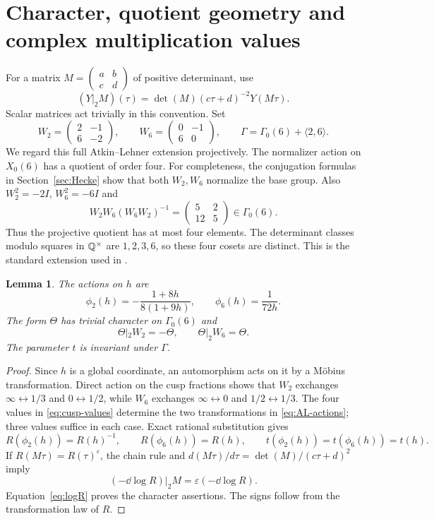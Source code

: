 \documentclass[11pt,a4paper]{article}
\newtheorem{lemma}[theorem]{Lemma}
\theoremstyle{remark}
\newcommand{\smat}[4]{\begin{pmatrix}#1&#2\\#3&#4\end{pmatrix}}
\begin{document}
\section{Character, quotient geometry and complex multiplication values}
\label{sec:geometry}
For a matrix $M=\smat abcd$ of positive determinant, use
\begin{equation}\label{eq:slash}
 (Y|_2M)(\tau)=\det(M)(c\tau+d)^{-2}Y(M\tau).
\end{equation}
Scalar matrices act trivially in this convention.
Set
\begin{equation}\label{eq:AL-matrices}
 W_2=\smat{2}{-1}{6}{-2},\qquad
 W_6=\smat{0}{-1}{6}{0},\qquad
 \Gamma=\Gamma_0(6)+\langle2,6\rangle.
\end{equation}
We regard this full Atkin--Lehner extension projectively.
The normalizer action on $X_0(6)$ has a quotient of order four.
For completeness, the conjugation formulas in
Section~\ref{sec:Hecke} show that both $W_2,W_6$ normalize the base
group. Also $W_2^2=-2I$, $W_6^2=-6I$ and
\begin{equation}\label{eq:commutator}
 W_2W_6(W_6W_2)^{-1}=\smat{5}{2}{12}{5}\in\Gamma_0(6).
\end{equation}
Thus the projective quotient has at most four elements.
The determinant classes modulo squares in $\mathbb Q^\times$ are
$1,2,3,6$, so these four cosets are distinct.
This is the standard extension used in \cite[Section~3]{beukers}.

\begin{lemma}\label{lem:character}
The actions on $h$ are
\begin{equation}\label{eq:AL-actions}
 \phi_2(h)=-\frac{1+8h}{8(1+9h)},\qquad
 \phi_6(h)=\frac1{72h}.
\end{equation}
The form $\Theta$ has trivial character on $\Gamma_0(6)$ and
\[
 \Theta|_2W_2=-\Theta,\qquad \Theta|_2W_6=\Theta.
\]
The parameter $t$ is invariant under $\Gamma$.
\end{lemma}
\begin{proof}
Since $h$ is a global coordinate, an automorphism acts on it by a
M\"obius transformation. Direct action on the cusp fractions shows
that $W_2$ exchanges $\infty\leftrightarrow1/3$ and
$0\leftrightarrow1/2$, while $W_6$ exchanges
$\infty\leftrightarrow0$ and $1/2\leftrightarrow1/3$.
The four values in \eqref{eq:cusp-values} determine the two
transformations in \eqref{eq:AL-actions}; three values suffice in each case.
Exact rational substitution gives
\[
 R(\phi_2(h))=R(h)^{-1},\qquad R(\phi_6(h))=R(h),
 \qquad t(\phi_2(h))=t(\phi_6(h))=t(h).
\]
If $R(M\tau)=R(\tau)^\varepsilon$, the chain rule and
$d(M\tau)/d\tau=\det(M)/(c\tau+d)^2$ imply
\[
 (-\dd\log R)|_2M=\varepsilon(-\dd\log R).
\]
Equation~\eqref{eq:logR} proves the character assertions.
The signs follow from the transformation law of $R$.
\end{proof}
\end{document}

